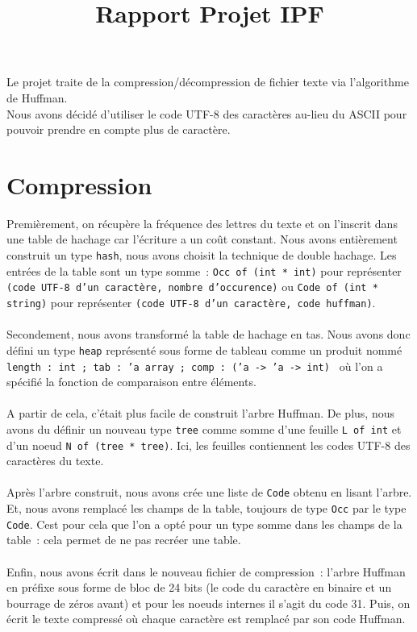 \documentclass{article}
\author{}
\date{}
\title{Rapport Projet IPF}
\begin{document}
  \maketitle\thispagestyle{fancy}

  Le projet traite de la compression/décompression de fichier texte via l'algorithme de Huffman. \\
  Nous avons décidé d'utiliser le code UTF-8 des caractères au-lieu du ASCII pour pouvoir prendre en compte plus de caractère.

  \section*{Compression}
  Premièrement, on récupère la fréquence des lettres du texte et on l'inscrit dans une table de hachage car l'écriture a un coût constant. Nous avons entièrement construit un type \texttt{hash}, nous avons choisit la technique de double hachage. Les entrées de la table sont un type somme~: \texttt{Occ of (int * int)} pour représenter \texttt{(code UTF-8 d'un caractère, nombre d'occurence)} ou \texttt{Code of (int * string)} pour représenter \texttt{(code UTF-8 d'un caractère, code huffman)}. \\ \\
  Secondement, nous avons transformé la table de hachage en tas. Nous avons donc défini un type \texttt{heap} représenté sous forme de tableau comme un produit nommé \texttt{{ length : int ; tab : 'a array ; comp : ('a -> 'a -> int) }} où l'on a spécifié la fonction de comparaison entre éléments. \\ \\
  A partir de cela, c'était plus facile de construit l'arbre Huffman. De plus, nous avons du définir un nouveau type \texttt{tree} comme somme d'une feuille \texttt{L of int} et d'un noeud \texttt{N of (tree * tree)}. Ici, les feuilles contiennent les codes UTF-8 des caractères du texte. \\ \\
  Après l'arbre construit, nous avons crée une liste de \texttt{Code} obtenu en lisant l'arbre. Et, nous avons remplacé les champs de la table, toujours de type \texttt{Occ} par le type \texttt{Code}. Cest pour cela que l'on a opté pour un type somme dans les champs de la table~: cela permet de ne pas recréer une table. \\ \\
  Enfin, nous avons écrit dans le nouveau fichier de compression~: l'arbre Huffman en préfixe sous forme de bloc de 24 bits (le code du caractère en binaire et un bourrage de zéros avant) et pour les noeuds internes il s'agit du code 31. Puis, on écrit le texte compressé où chaque caractère est remplacé par son code Huffman.
\end{document}
